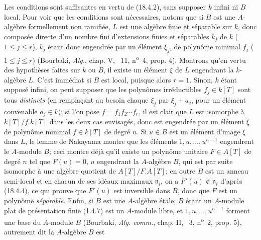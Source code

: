Les conditions sont suffisantes en vertu de (18.4.2), sans supposer $k$ infini ni $B$ local. Pour voir que les conditions sont nécessaires, notons que si $B$ est une $A$-algèbre formellement non ramifiée, $L$ est une algèbre finie et séparable sur $k$, donc composée directe d'un nombre fini d'extensions finies et séparables $k_j$ de $k$ ($1\leq j\leq r$), $k_j$ étant donc engendrée par un élément $\xi_j$, de polynôme minimal $f_j$ ($1\leq j\leq r$) (Bourbaki, \emph{Alg.}, chap. V, \textsection~11, n\textsuperscript{o}~4, prop. 4). Montrons qu'en vertu des hypothèses faites sur $k$ ou $B$, il existe un élément $\xi$ de $L$ engendrant la $k$-algèbre $L$. C'est immédiat si $B$ est local, puisque alors $r=1$. Sinon, $k$ étant supposé infini, on peut supposer que les polynômes irréductibles $f_j\in k[T]$ sont tous \emph{distincts} (en remplaçant au besoin chaque $\xi_j$ par $\xi_j+a_j$, pour un élément convenable $a_j\in k$); si l'on pose $f=f_1f_2\cdots f_r$, il est clair que $L$ est isomorphe à $k[T]/f.k[T]$ dans les deux cas envisagés, donc est engendrée par un élément $\xi$ de polynôme minimal $f\in k[T]$ de degré $n$. Si $u\in B$ est un élément d'image $\xi$ dans $L$, le lemme de Nakayama montre que les éléments $1,u,\ldots,u^{n-1}$ engendrent le $A$-module $B$; ceci montre déjà qu'il existe un polynôme unitaire $F\in A[T]$ de degré $n$ tel que $F(u)=0$, $u$ engendrant la $A$-algèbre $B$, qui est par suite isomorphe à une algèbre quotient de $A[T]/F.A[T]$; en outre $B$ est un anneau semi-local et en chacun de ses idéaux maximaux $\mathfrak n_i$, on a $F'(u)\notin\mathfrak n_i$ d'après (18.4.4), ce qui prouve que $F'(u)$ est inversible dans $B$, donc que $F$ est un polynôme \emph{séparable}. Enfin, si $B$ est une $A$-algèbre étale, $B$ étant un $A$-module plat de présentation finie (1.4.7) est un $A$-module libre, et $1,u,\ldots,u^{n-1}$ forment une base du $A$-module $B$ (Bourbaki, \emph{Alg. comm.}, chap. II, \textsection~3, n\textsuperscript{o}~2, prop. 5), autrement dit la $A$-algèbre $B$ est

